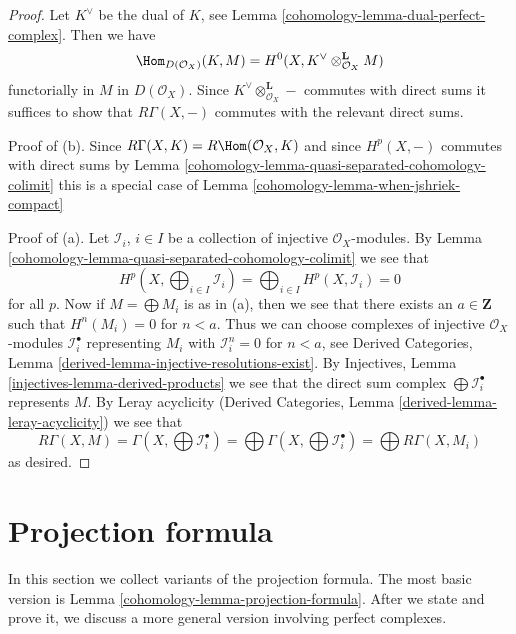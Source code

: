 \begin{proof}

Let $K^\vee$ be the dual of $K$, see
Lemma \ref{cohomology-lemma-dual-perfect-complex}. Then we have
$$
\Hom_{D(\mathcal{O}_X)}(K, M) =
H^0(X, K^\vee \otimes_{\mathcal{O}_X}^\mathbf{L} M)
$$
functorially in $M$ in $D(\mathcal{O}_X)$.
Since $K^\vee \otimes_{\mathcal{O}_X}^\mathbf{L} -$ commutes with
direct sums it suffices
to show that $R\Gamma(X, -)$ commutes with the relevant direct sums.

\medskip\noindent
Proof of (b). Since $R\Gamma(X, K) = R\Hom(\mathcal{O}_X, K)$
and since $H^p(X, -)$ commutes with direct sums by
Lemma \ref{cohomology-lemma-quasi-separated-cohomology-colimit}
this is a special case of
Lemma \ref{cohomology-lemma-when-jshriek-compact}

\medskip\noindent
Proof of (a). Let $\mathcal{I}_i$, $i \in I$ be a collection of injective
$\mathcal{O}_X$-modules. By Lemma \ref{cohomology-lemma-quasi-separated-cohomology-colimit}
we see that
$$
H^p(X, \bigoplus\nolimits_{i \in I} \mathcal{I}_i) =
\bigoplus\nolimits_{i \in I} H^p(X, \mathcal{I}_i) = 0
$$
for all $p$. Now if $M = \bigoplus M_i$ is as in (a), then we
see that there exists an $a \in \mathbf{Z}$ such that $H^n(M_i) = 0$
for $n < a$. Thus we can choose complexes of injective $\mathcal{O}_X$-modules
$\mathcal{I}_i^\bullet$ representing $M_i$
with $\mathcal{I}_i^n = 0$ for $n < a$, see
Derived Categories, Lemma \ref{derived-lemma-injective-resolutions-exist}.
By Injectives, Lemma \ref{injectives-lemma-derived-products}
we see that the direct sum complex $\bigoplus \mathcal{I}_i^\bullet$
represents $M$. By Leray acyclicity
(Derived Categories, Lemma \ref{derived-lemma-leray-acyclicity})
we see that
$$
R\Gamma(X, M) = \Gamma(X, \bigoplus \mathcal{I}_i^\bullet) =
\bigoplus \Gamma(X, \bigoplus \mathcal{I}_i^\bullet) =
\bigoplus R\Gamma(X, M_i)
$$
as desired.
\end{proof}

\section{Projection formula}
\label{cohomology-section-projection-formula}
In this section we collect variants of the projection formula.
The most basic version is Lemma \ref{cohomology-lemma-projection-formula}.
After we state and prove it, we discuss a more general version
involving perfect complexes.

